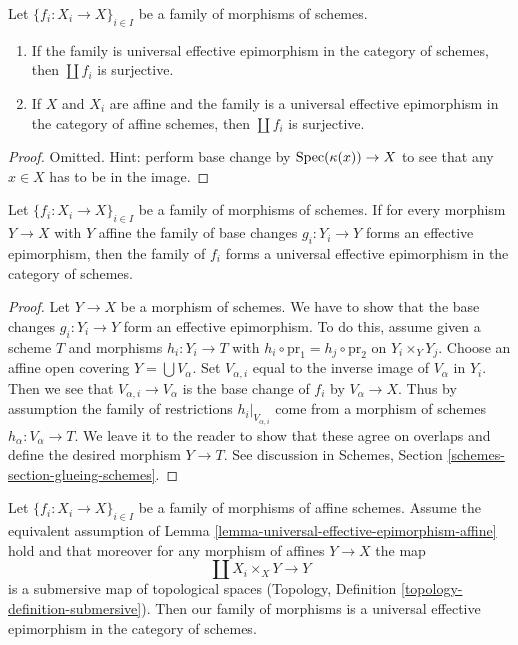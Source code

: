 \begin{lemma}
\label{lemma-universal-effective-epimorphism-surjective}
Let $\{f_i : X_i \to X\}_{i \in I}$ be a family of morphisms of schemes.
\begin{enumerate}
\item If the family is universal effective
epimorphism in the category of schemes, then $\coprod f_i$ is surjective.
\item If $X$ and $X_i$ are affine and the family is a universal effective
epimorphism in the category of affine schemes, then
$\coprod f_i$ is surjective.
\end{enumerate}
\end{lemma}

\begin{proof}
Omitted. Hint: perform base change by $\mathop{\mathrm{Spec}}(\kappa(x)) \to X$
to see that any $x \in X$ has to be in the image.
\end{proof}

\begin{lemma}
\label{lemma-check-universal-effective-epimorphism-affine}
Let $\{f_i : X_i \to X\}_{i \in I}$ be a family of morphisms of schemes.
If for every morphism $Y \to X$ with $Y$ affine the family of base changes
$g_i : Y_i \to Y$ forms an effective epimorphism, then
the family of $f_i$ forms a universal effective epimorphism
in the category of schemes.
\end{lemma}

\begin{proof}
Let $Y \to X$ be a morphism of schemes. We have to show that
the base changes $g_i : Y_i \to Y$ form an effective epimorphism.
To do this, assume given a scheme $T$ and morphisms $h_i : Y_i \to T$
with $h_i \circ \text{pr}_1 = h_j \circ \text{pr}_2$ on
$Y_i \times_Y Y_j$.
Choose an affine open covering $Y = \bigcup V_\alpha$.
Set $V_{\alpha, i}$ equal to the inverse image of
$V_\alpha$ in $Y_i$. Then we see that
$V_{\alpha, i}  \to V_\alpha$ is the base change of
$f_i$ by $V_\alpha \to X$. Thus by assumption
the family of restrictions $h_i|_{V_{\alpha, i}}$
come from a morphism of schemes $h_\alpha : V_\alpha \to T$.
We leave it to the reader to show that these agree
on overlaps and define the desired morphism $Y \to T$.
See discussion in Schemes, Section \ref{schemes-section-glueing-schemes}.
\end{proof}

\begin{lemma}
\label{lemma-universal-effective-epimorphism}
Let $\{f_i : X_i \to X\}_{i \in I}$ be a family of morphisms of affine
schemes. Assume the equivalent assumption of
Lemma \ref{lemma-universal-effective-epimorphism-affine} hold
and that moreover for any morphism of affines $Y \to X$ the map
$$
\coprod X_i \times_X Y \longrightarrow Y
$$
is a submersive map of topological spaces
(Topology, Definition \ref{topology-definition-submersive}).
Then our family of morphisms is a universal effective epimorphism
in the category of schemes.
\end{lemma}


